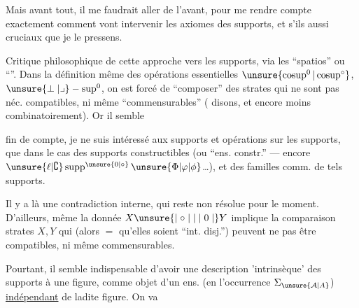 Mais avant tout, il me faudrait aller de l'avant, pour me rendre compte exactement comment vont intervenir les axiomes des supports, et s'ils  aussi cruciaux que je le pressens.


Critique philosophique de cette approche vers les supports, via les ``spatios'' ou ``''. Dans la définition même des opérations essentielles $\unsure{\operatorname{co\!-\!sup}^{0}|\operatorname{co\!-\!sup}^{\circ}}$, $\unsure{\perp|\lrcorner}-\operatorname{sup}^{0}$, on est forcé de ``composer'' des strates qui ne sont pas néc. compatibles, ni même ``commensurables'' ( disons, et encore moins combinatoirement). Or il semble 


fin de compte, je ne suis intéressé aux supports et opérations sur les supports, que dans le cas des supports constructibles (ou ``ens. constr.'' ---  encore $\unsure{\ell|\complement}\operatorname{supp}^{\unsure{0|\circ}}\unsure{\Phi|\varphi|\phi}$\ldots), et des familles comm. de tels supports.

Il y a  là une contradiction interne, qui reste non résolue pour le moment. D'ailleurs, même la donnée  $X\unsure{\mid\circ\mid|\mid0\mid}Y$ implique la comparaison  strates $X,Y$ qui (alors $=$ qu'elles soient ``int. disj.'') peuvent ne pas être compatibles, ni même commensurables.

Pourtant, il semble indispensable d'avoir une description 'intrinsèque' des supports  à une figure, comme objet d'un ens. (en l'occurrence $\Sigma_{\unsure{\mathcal A|A}}$) \uline{indépendant} de ladite figure. On va 
